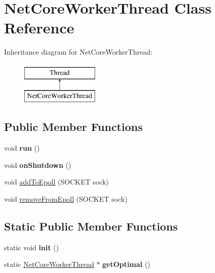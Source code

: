 \hypertarget{classNetCoreWorkerThread}{\section{\-Net\-Core\-Worker\-Thread \-Class \-Reference}
\label{classNetCoreWorkerThread}
}
\-Inheritance diagram for \-Net\-Core\-Worker\-Thread\-:\begin{figure}[H]
\begin{center}
\leavevmode
\includegraphics[height=2.000000cm]{classNetCoreWorkerThread}
\end{center}
\end{figure}
\subsection*{\-Public \-Member \-Functions}
\begin{DoxyCompactItemize}
\item 
\hypertarget{classNetCoreWorkerThread_a743b906293b9ed2c3bfc1749e6257187}{void {\bfseries run} ()}\label{classNetCoreWorkerThread_a743b906293b9ed2c3bfc1749e6257187}

\item 
\hypertarget{classNetCoreWorkerThread_a6ffdaca7b662d69cf305fbd8d9044222}{void {\bfseries on\-Shutdown} ()}\label{classNetCoreWorkerThread_a6ffdaca7b662d69cf305fbd8d9044222}

\item 
void \hyperlink{classNetCoreWorkerThread_a26fec8097fb7527f7df92f79db7eed8c}{add\-To\-Epoll} (\-S\-O\-C\-K\-E\-T sock)
\item 
void \hyperlink{classNetCoreWorkerThread_a2853f664c9198eef3f39b42cb2a5c8f8}{remove\-From\-Epoll} (\-S\-O\-C\-K\-E\-T sock)
\end{DoxyCompactItemize}
\subsection*{\-Static \-Public \-Member \-Functions}
\begin{DoxyCompactItemize}
\item 
\hypertarget{classNetCoreWorkerThread_acc23f124f49ab8d395bca5c99068a5a4}{static void {\bfseries init} ()}\label{classNetCoreWorkerThread_acc23f124f49ab8d395bca5c99068a5a4}

\item 
\hypertarget{classNetCoreWorkerThread_ac0edd487f480a6c7c5ff283863ac004e}{static \hyperlink{classNetCoreWorkerThread}{\-Net\-Core\-Worker\-Thread} $\ast$ {\bfseries get\-Optimal} ()}\label{classNetCoreWorkerThread_ac0edd487f480a6c7c5ff283863ac004e}

\end{DoxyCompactItemize}

